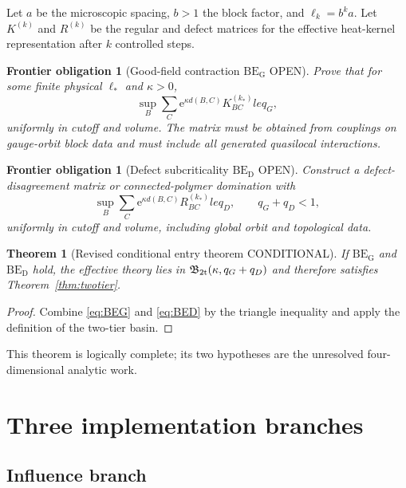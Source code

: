 \documentclass[11pt]{article}
\newcommand{\Cstatus}{\textcolor{conditional}{\textsf{CONDITIONAL}}}
\newcommand{\Ostatus}{\textcolor{open}{\textsf{OPEN}}}
\newcommand{\e}{\mathrm e}
\newtheorem{theorem}[definition]{Theorem}
\newtheorem{obligation}[definition]{Frontier obligation}
\theoremstyle{remark}
\begin{document}
Let $a$ be the microscopic spacing, $b>1$ the block factor, and
$\ell_k=b^ka$.  Let $K^{(k)}$ and $R^{(k)}$ be the regular and defect matrices
for the effective heat-kernel representation after $k$ controlled steps.

\begin{obligation}[Good-field contraction $\mathrm{BE_G}$ \Ostatus]
Prove that for some finite physical $\ell_*$ and $\kappa>0$,
\begin{equation}\label{eq:BEG}
 \sup_B\sum_C\e^{\kappa d(B,C)}K^{(k_*)}_{BC}le q_G,
\end{equation}
uniformly in cutoff and volume.  The matrix must be obtained from couplings on
gauge-orbit block data and must include all generated quasilocal interactions.
\end{obligation}

\begin{obligation}[Defect subcriticality $\mathrm{BE_D}$ \Ostatus]
Construct a defect-disagreement matrix or connected-polymer domination with
\begin{equation}\label{eq:BED}
 \sup_B\sum_C\e^{\kappa d(B,C)}R^{(k_*)}_{BC}le q_D,
 \qquad q_G+q_D<1,
\end{equation}
uniformly in cutoff and volume, including global orbit and topological data.
\end{obligation}

\begin{theorem}[Revised conditional entry theorem \Cstatus]
If $\mathrm{BE_G}$ and $\mathrm{BE_D}$ hold, the effective theory lies in
$\mathfrak B_{\rm 2t}(\kappa,q_G+q_D)$ and therefore satisfies
Theorem~\ref{thm:twotier}.
\end{theorem}

\begin{proof}
Combine \eqref{eq:BEG} and \eqref{eq:BED} by the triangle inequality and apply
the definition of the two-tier basin.
\end{proof}

This theorem is logically complete; its two hypotheses are the unresolved
four-dimensional analytic work.

\section{Three implementation branches}

\subsection{Influence branch}
\end{document}

